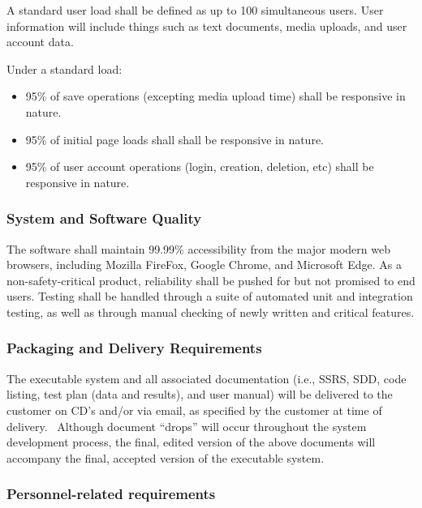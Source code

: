 \documentclass[letterpaper, 10pt, draftclsnofoot, compsoc, onecolumn]{IEEEtran}
\begin{document}
{{\noindent
A standard user load shall be defined as up to 100 simultaneous users. User information
will include things such as text documents, media uploads, and user account data.

Under a standard load:
\begin{itemize}
  \item 95\% of save operations (excepting media upload time) shall be responsive in 
  nature.
  \item 95\% of initial page loads shall shall be responsive in 
  nature.
  \item 95\% of user account operations (login, creation, deletion, etc) shall be 
  responsive in nature.
\end{itemize}}

\subsubsection[System and Software Quality]{\rmfamily\bfseries\color{black} System and Software Quality}

The software shall maintain 99.99\% accessibility from the major modern web browsers, including Mozilla FireFox, Google Chrome, and Microsoft Edge.
As a non-safety-critical product, reliability shall be pushed for but not promised
to end users. Testing shall be handled through a suite of automated unit and integration testing, as well as
through manual checking of newly written and critical features.

\subsubsection[Packaging and Delivery Requirements]{\rmfamily\bfseries\color{black} Packaging and Delivery Requirements}

{\noindent 
The executable system and all associated documentation (i.e., SSRS, SDD,
code listing, test plan (data and results), and user manual) will be
delivered to the customer on CD{\textquoteright}s and/or via email, as
specified by the customer at time of delivery. \ Although document
{\textquotedblleft}drops{\textquotedblright} will occur throughout the
system development process, the final, edited version of the above
documents will accompany the final, accepted version of the executable
system.}

\subsubsection[Personnel{}-related requirements]{\rmfamily\bfseries\color{black} Personnel-related requirements} 

}
\end{document}
